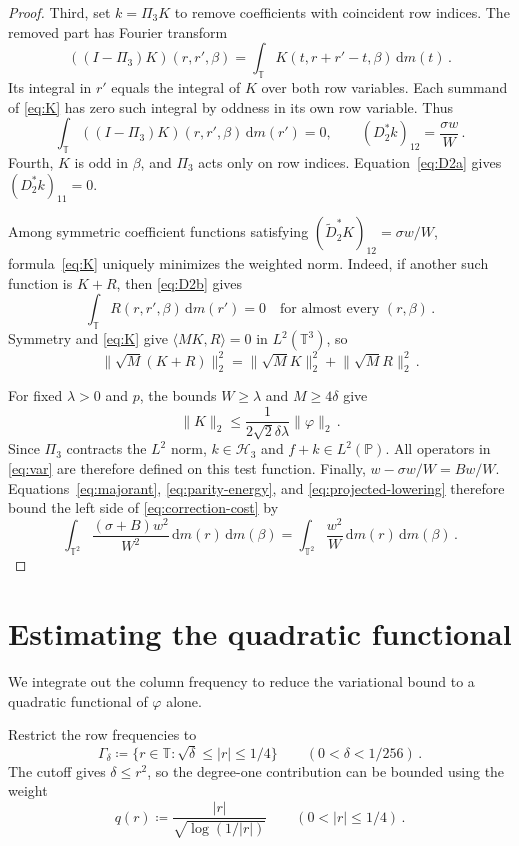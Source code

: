 \documentclass[11pt]{amsart}
\theoremstyle{plain}
\theoremstyle{definition}
\newcommand{\T}{\mathbb T}
\renewcommand{\P}{\mathbb P}
\newcommand{\1}{\mathbf 1}
\newcommand{\ip}[2]{\langle #1,#2\rangle}
\newcommand{\norm}[1]{\lVert #1\rVert}
\newcommand{\abs}[1]{\lvert #1\rvert}
\newcommand{\dd}{\,\mathrm d}
\newcommand{\Hs}{\mathcal H}
\begin{document}
\begin{proof}
Third, set $k=\Pi_3K$ to remove coefficients with coincident row indices.
The removed part has Fourier transform
\[
  ((I-\Pi_3)K)(r,r',\beta)
  =\int_\T K(t,r+r'-t,\beta)\dd m(t)\, .
\]
Its integral in $r'$ equals the integral of $K$ over both row variables.
Each summand of \eqref{eq:K} has zero such integral by oddness in its
own row variable.  Thus
\begin{equation}\label{eq:projected-lowering}
  \int_\T((I-\Pi_3)K)(r,r',\beta)\dd m(r')=0,
  \qquad (D_2^*k)_{12}=\frac{\sigma w}{W}\, .
\end{equation}
Fourth, $K$ is odd in $\beta$, and $\Pi_3$ acts only on row indices.
Equation~\eqref{eq:D2a} gives $(D_2^*k)_{11}=0$.

Among symmetric coefficient functions satisfying
$(\widetilde D_2^*K)_{12}=\sigma w/W$, formula~\eqref{eq:K}
uniquely minimizes the weighted norm.
Indeed, if another such function is $K+R$, then \eqref{eq:D2b} gives
\[
  \int_\T R(r,r',\beta)\dd m(r')=0
  \quad\text{for almost every }(r,\beta)\, .
\]
Symmetry and \eqref{eq:K} give $\ip{MK}R=0$ in $L^2(\T^3)$, so
\[
  \norm{\sqrt M(K+R)}_2^2
  =\norm{\sqrt M K}_2^2+\norm{\sqrt M R}_2^2\, .
\]

For fixed $\lambda>0$ and $p$, the bounds $W\geq\lambda$ and
$M\geq4\delta$ give
\[
  \norm K_2\leq\frac{1}{2\sqrt2\delta\lambda}\norm\varphi_2\, .
\]
Since $\Pi_3$ contracts the $L^2$ norm, $k\in\Hs_3$ and
$f+k\in L^2(\P)$.  All operators in \eqref{eq:var} are therefore defined
on this test function.
Finally, $w-\sigma w/W=Bw/W$.
Equations~\eqref{eq:majorant}, \eqref{eq:parity-energy}, and
\eqref{eq:projected-lowering} therefore bound the left side of
\eqref{eq:correction-cost} by
\[
  \int_{\T^2}\frac{(\sigma+B)w^2}{W^2}\dd m(r)\dd m(\beta)
  =\int_{\T^2}\frac{w^2}{W}\dd m(r)\dd m(\beta)\, .
\]
\end{proof}

\section{Estimating the quadratic functional}\label{sec:effective-energy}

We integrate out the column frequency to reduce the variational bound
to a quadratic functional of $\varphi$ alone.

Restrict the row frequencies to
\begin{equation}\label{eq:Gamma-q}
  \Gamma_\delta\coloneqq
  \{r\in\T:\sqrt\delta\leq\abs r\leq1/4\}
  \qquad(0<\delta<1/256)\, .
\end{equation}
The cutoff gives $\delta\leq r^2$, so the degree-one contribution can
be bounded using the weight
\begin{equation}\label{eq:q}
  q(r)\coloneqq\frac{\abs r}{\sqrt{\log(1/\abs r)}}
  \qquad(0<\abs r\leq1/4)\, .
\end{equation}
\end{document}
